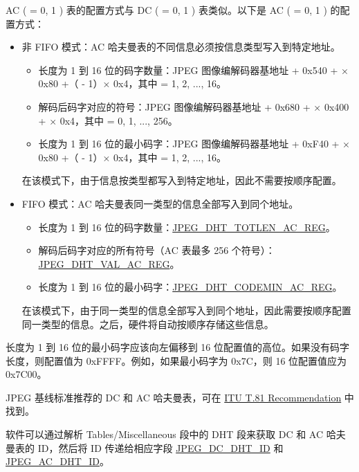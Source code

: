 \documentclass[main\_\_CN.tex]{subfiles}
\begin{document}
AC ( = 0, 1 ) 表的配置方式与 DC ( = 0, 1 ) 表类似。以下是 AC ( = 0, 1 ) 的配置方式：

\begin{itemize}
    \item 非 FIFO 模式：AC 哈夫曼表的不同信息必须按信息类型写入到特定地址。
    \begin{itemize}
        \item 长度为 1 到 16 位的码字数量：JPEG 图像编解码器基地址 + 0x540 +  × 0x80 +（ - 1）× 0x4，其中  = 1, 2, ..., 16。
        \item 解码后码字对应的符号：JPEG 图像编解码器基地址 + 0x680 +  × 0x400 +  × 0x4，其中  = 0, 1, ..., 256。
        \item 长度为 1 到 16 位的最小码字：JPEG 图像编解码器基地址 + 0xF40 +  × 0x80 +（ - 1）× 0x4，其中  = 1, 2, ..., 16。
    \end{itemize}
    在该模式下，由于信息按类型都写入到特定地址，因此不需要按顺序配置。
    \item FIFO 模式：AC 哈夫曼表同一类型的信息全部写入到同个地址。
    \begin{itemize}
        \item 长度为 1 到 16 位的码字数量：\hyperref[regdesc:JPEGDHTTOTLENAC0REG]{JPEG\_DHT\_TOTLEN\_AC\_REG}。
        \item 解码后码字对应的所有符号（AC 表最多 256 个符号）：\hyperref[regdesc:JPEGDHTVALAC0REG]{JPEG\_DHT\_VAL\_AC\_REG}。
        \item 长度为 1 到 16 位的最小码字：\hyperref[regdesc:JPEGDHTCODEMINAC0REG]{JPEG\_DHT\_CODEMIN\_AC\_REG}。
    \end{itemize}
    在该模式下，由于同一类型的信息全部写入到同个地址，因此需要按顺序配置同一类型的信息。之后，硬件将自动按顺序存储这些信息。
\end{itemize}

长度为 1 到 16 位的最小码字应该向左偏移到 16 位配置值的高位。如果没有码字长度，则配置值为 0xFFFF。例如，如果最小码字为 0x7C，则 16 位配置值应为 0x7C00。

JPEG 基线标准推荐的 DC 和 AC 哈夫曼表，可在 \href{https://www.itu.int/rec/T-REC-T.81}{ITU T.81 Recommendation} 中找到。

软件可以通过解析 Tables/Miscellaneous 段中的 DHT 段来获取 DC 和 AC 哈夫曼表的 ID，然后将 ID 传递给相应字段 \hyperref[regdesc:JPEGDHTINFOREG]{JPEG\_DC\_DHT\_ID} 和 \hyperref[regdesc:JPEGDHTINFOREG]{JPEG\_AC\_DHT\_ID}。
\end{document}
